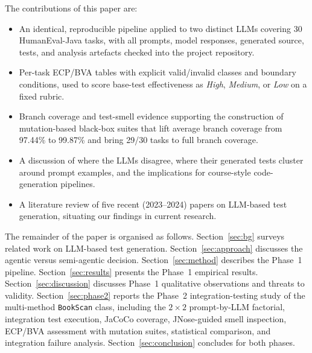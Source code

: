 \documentclass[journal]{IEEEtran}
\begin{document}
The contributions of this paper are:
\begin{itemize}
    \item An identical, reproducible pipeline applied to two
    distinct LLMs covering 30 HumanEval-Java tasks, with all
    prompts, model responses, generated source, tests, and
    analysis artefacts checked into the project repository.
    \item Per-task ECP/BVA tables with explicit valid/invalid
    classes and boundary conditions, used to score base-test
    effectiveness as \emph{High}, \emph{Medium}, or \emph{Low}
    on a fixed rubric.
    \item Branch coverage and test-smell evidence supporting
    the construction of mutation-based black-box suites that
    lift average branch coverage from 97.44\% to 99.87\% and
    bring 29/30 tasks to full branch coverage.
    \item A discussion of where the LLMs disagree, where their
    generated tests cluster around prompt examples, and the
    implications for course-style code-generation pipelines.
    \item A literature review of five recent (2023--2024)
    papers on LLM-based test generation, situating our findings
    in current research.
\end{itemize}

The remainder of the paper is organised as follows.
Section~\ref{sec:bg} surveys related work on LLM-based test
generation. Section~\ref{sec:approach} discusses the agentic
versus semi-agentic decision. Section~\ref{sec:method}
describes the Phase~1 pipeline.
Section~\ref{sec:results} presents the Phase~1 empirical
results. Section~\ref{sec:discussion} discusses Phase~1
qualitative observations and threats to validity.
Section~\ref{sec:phase2} reports the Phase~2 integration-testing
study of the multi-method \texttt{BookScan} class, including
the $2 \times 2$ prompt-by-LLM factorial, integration test
execution, JaCoCo coverage, JNose-guided smell inspection,
ECP/BVA assessment with mutation suites, statistical comparison,
and integration failure analysis. Section~\ref{sec:conclusion}
concludes for both phases.

%
\end{document}
